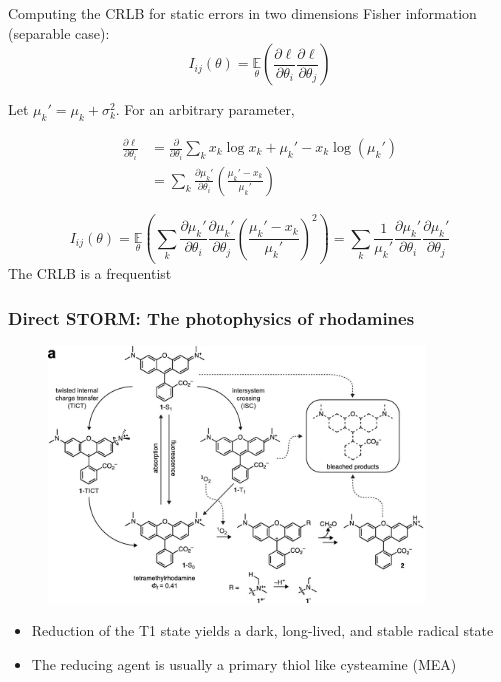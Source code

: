 \documentclass{beamer}					%
\begin{document}
\begin{frame}{Computing the CRLB for static errors in two dimensions}
Fisher information (separable case): \begin{equation}
I_{ij}(\theta) = \underset{\theta}{\mathbb{E}}\left(\frac{\partial \ell}{\partial\theta_{i}}\frac{\partial\ell}{\partial\theta_{j}}\right) 
\end{equation}

Let $\mu_{k}' = \mu_{k} + \sigma_{k}^{2}$. For an arbitrary parameter,

\begin{align*}
\frac{\partial \ell}{\partial \theta_{i}} &= \frac{\partial}{\partial \theta_{i}} \sum_{k}  x_{k}\log x_{k} + \mu_{k}' - x_{k}\log\left(\mu_{k}'\right)\\
&= \sum_{k} \frac{\partial \mu_{k}'}{\partial\theta_{i}} \left(\frac{\mu_{k}'-x_{k}}{\mu_{k}'}\right)
\end{align*}

\begin{equation*}
I_{ij}(\theta) = \underset{\theta}{\mathbb{E}}\left(\sum_{k}\frac{\partial \mu_{k}'}{\partial\theta_{i}}\frac{\partial \mu_{k}'}{\partial\theta_{j}} \left(\frac{\mu_{k}'-x_{k}}{\mu_{k}'}\right)^{2}\right) = \sum_{k}\frac{1}{\mu_{k}'}\frac{\partial \mu_{k}'}{\partial\theta_{i}}\frac{\partial \mu_{k}'}{\partial\theta_{j}}
\end{equation*}
The CRLB is a frequentist 
\end{frame}

\begin{frame}
\frametitle{Direct STORM: The photophysics of rhodamines}

\begin{figure}
\includegraphics[width=10cm]{Rhodamines.png}
\end{figure}
\begin{itemize}
\item  Reduction of the T1 state yields a dark, long-lived, and stable radical state
\item The reducing agent is usually a primary thiol like cysteamine (MEA)
\end{itemize}
\end{frame}
\end{document}
